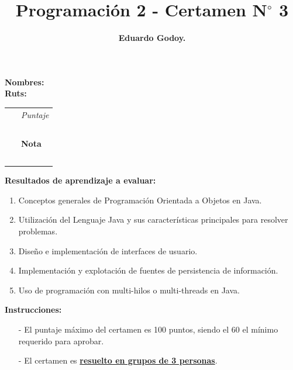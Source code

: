 \documentclass{exam}
\title{\huge\bfseries{\color{azul}Programaci\'on 2 - Certamen N$^{\circ}$ 3 }}
\author{\textbf{Eduardo Godoy.}}
\begin{document}


\maketitle

\begin{multicols}{2}
    \begin{flushleft}
        \textbf{Nombres:} \\
        \vspace*{2mm}
        \textbf{Ruts:}
    \end{flushleft}
    \begin{center}
        \begin{table}[H]
        \begin{tabular}{p{4cm}|p{3cm}|}
        \cline{2-2}
            ~ & {\em {\scriptsize Puntaje}} \\ & ~ \\
            ~ & \textbf{Nota} \\ & ~ \\
        \cline{2-2}
        \end{tabular}
        \end{table}
    \end{center}
\end{multicols}


\vspace*{-7mm}
\noindent
\textbf{Resultados de aprendizaje a evaluar:}
\begin{enumerate}
  \item Conceptos generales de Programación Orientada a Objetos en Java.
  \item Utilizaci\'on del Lenguaje Java y sus caracter\'isticas principales para resolver problemas.
  \item Diseño e implementaci\'on de interfaces de usuario.
  \item Implementaci\'on y explotaci\'on de fuentes de persistencia de
    informaci\'on.    
  \item Uso de programación con multi-hilos o multi-threads en Java.
\end{enumerate}
\vspace{5mm}
\noindent
\textbf{Instrucciones:}
\begin{itemize}
  \item[-] El puntaje m\'aximo del certamen es 100 puntos, siendo el
    60 el m\'inimo requerido para aprobar.
  \item[-] El certamen es \underline{\textbf{resuelto en grupos de 3 personas}}.
\end{itemize}
\end{document}
